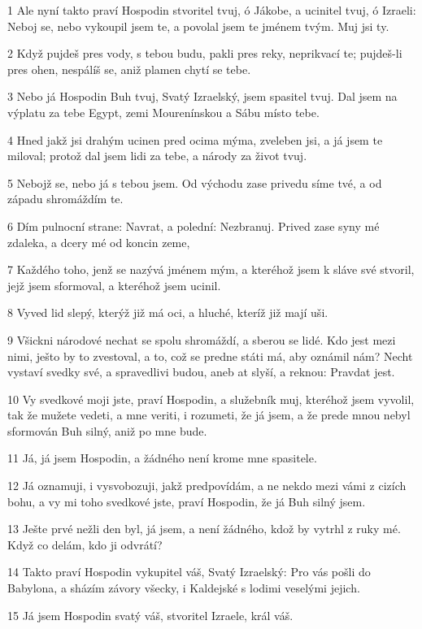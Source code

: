 \par 1 Ale nyní takto praví Hospodin stvoritel tvuj, ó Jákobe, a ucinitel tvuj, ó Izraeli: Neboj se, nebo vykoupil jsem te, a povolal jsem te jménem tvým. Muj jsi ty.
\par 2 Když pujdeš pres vody, s tebou budu, pakli pres reky, neprikvací te; pujdeš-li pres ohen, nespálíš se, aniž plamen chytí se tebe.
\par 3 Nebo já Hospodin Buh tvuj, Svatý Izraelský, jsem spasitel tvuj. Dal jsem na výplatu za tebe Egypt, zemi Mourenínskou a Sábu místo tebe.
\par 4 Hned jakž jsi drahým ucinen pred ocima mýma, zveleben jsi, a já jsem te miloval; protož dal jsem lidi za tebe, a národy za život tvuj.
\par 5 Nebojž se, nebo já s tebou jsem. Od východu zase privedu síme tvé, a od západu shromáždím te.
\par 6 Dím pulnocní strane: Navrat, a polední: Nezbranuj. Prived zase syny mé zdaleka, a dcery mé od koncin zeme,
\par 7 Každého toho, jenž se nazývá jménem mým, a kteréhož jsem k sláve své stvoril, jejž jsem sformoval, a kteréhož jsem ucinil.
\par 8 Vyved lid slepý, kterýž již má oci, a hluché, kteríž již mají uši.
\par 9 Všickni národové nechat se spolu shromáždí, a sberou se lidé. Kdo jest mezi nimi, ješto by to zvestoval, a to, což se predne státi má, aby oznámil nám? Necht vystaví svedky své, a spravedlivi budou, aneb at slyší, a reknou: Pravdat jest.
\par 10 Vy svedkové moji jste, praví Hospodin, a služebník muj, kteréhož jsem vyvolil, tak že mužete vedeti, a mne veriti, i rozumeti, že já jsem, a že prede mnou nebyl sformován Buh silný, aniž po mne bude.
\par 11 Já, já jsem Hospodin, a žádného není krome mne spasitele.
\par 12 Já oznamuji, i vysvobozuji, jakž predpovídám, a ne nekdo mezi vámi z cizích bohu, a vy mi toho svedkové jste, praví Hospodin, že já Buh silný jsem.
\par 13 Ješte prvé nežli den byl, já jsem, a není žádného, kdož by vytrhl z ruky mé. Když co delám, kdo ji odvrátí?
\par 14 Takto praví Hospodin vykupitel váš, Svatý Izraelský: Pro vás pošli do Babylona, a sházím závory všecky, i Kaldejské s lodimi veselými jejich.
\par 15 Já jsem Hospodin svatý váš, stvoritel Izraele, král váš.
